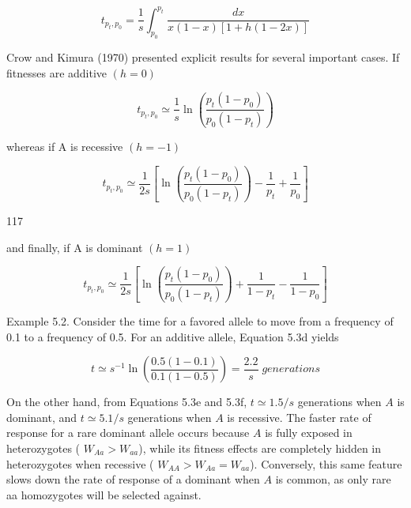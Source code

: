 \documentclass{article}
\begin{document}
\begin{equation}
t_{p_{t},p_{0}}=\frac{1}{s}\int_{p_{0}}^{p_{t}}\frac{dx}{x(1-x)[1+h(1-2x)]}
\tag{5.3c}
\label{eq:5_3c}
\end{equation}

Crow and Kimura (1970) presented explicit results for several important cases. If fitnesses are additive  $ (h = 0) $

\begin{equation}
t_{p_{t},p_{0}}\simeq\frac{1}{s}\ln\left(\frac{p_{t}\left(1-p_{0}\right)}{p_{0}\left(1-p_{t}\right)}\right)
\tag{5.3d}
\label{eq:5_3d}
\end{equation}

whereas if A is recessive  $ (h = -1) $

\begin{equation}
t_{p_{t},p_{0}}\simeq\frac{1}{2s}\left[\ln\left(\frac{p_{t}\left(1-p_{0}\right)}{p_{0}\left(1-p_{t}\right)}\right)-\frac{1}{p_{t}}+\frac{1}{p_{0}}\right]
\tag{5.3e}
\label{eq:5_3e}
\end{equation}

117

and finally, if A is dominant  $ (h = 1) $

\begin{equation}
t_{p_{t},p_{0}}\simeq\frac{1}{2s}\left[\ln\left(\frac{p_{t}\left(1-p_{0}\right)}{p_{0}\left(1-p_{t}\right)}\right)+\frac{1}{1-p_{t}}-\frac{1}{1-p_{0}}\right]
\tag{5.3f}
\label{eq:5_3f}
\end{equation}

Example 5.2. Consider the time for a favored allele to move from a frequency of 0.1 to a frequency of 0.5. For an additive allele, Equation 5.3d yields

\begin{equation}
t\simeq s^{-1}\ln\left(\frac{0.5\left(1-0.1\right)}{0.1\left(1-0.5\right)}\right)=\frac{2.2}{s}\;generations
\end{equation}

On the other hand, from Equations 5.3e and 5.3f,  $ t \simeq 1.5/s $ generations when  $ A $ is dominant, and  $ t \simeq 5.1/s $ generations when  $ A $ is recessive. The faster rate of response for a rare dominant allele occurs because  $ A $ is fully exposed in heterozygotes ( $ W_{Aa} > W_{aa} $), while its fitness effects are completely hidden in heterozygotes when recessive ( $ W_{AA} > W_{Aa} = W_{aa} $). Conversely, this same feature slows down the rate of response of a dominant when  $ A $ is common, as only rare aa homozygotes will be selected against.
\end{document}
